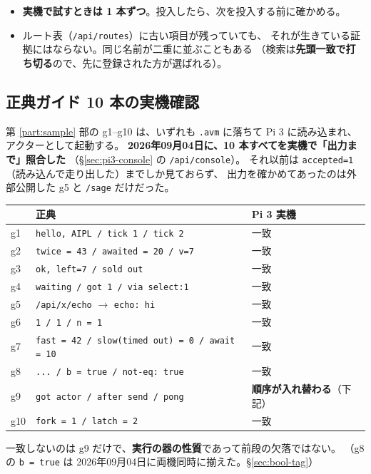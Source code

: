 \documentclass[11pt,a4paper]{ltjsarticle}
\begin{document}
\begin{itemize}
\item \textbf{実機で試すときは 1 本ずつ}。投入したら、次を投入する前に確かめる。
\item ルート表（\texttt{/api/routes}）に古い項目が残っていても、
  それが生きている証拠にはならない。同じ名前が二重に並ぶこともある
  （検索は\textbf{先頭一致で打ち切る}ので、先に登録された方が選ばれる）。
\end{itemize}

\subsection{正典ガイド 10 本の実機確認}

第 \ref{part:sample} 部の g1--g10 は、いずれも \texttt{.avm} に落ちて
Pi 3 に読み込まれ、アクターとして起動する。
\textbf{2026年09月04日に、10 本すべてを実機で「出力まで」照合した}
（\S\ref{sec:pi3-console} の \texttt{/api/console}）。
それ以前は \texttt{accepted=1}（読み込んで走り出した）までしか見ておらず、
出力を確かめてあったのは外部公開した g5 と \texttt{/sage} だけだった。

\begin{center}
\small
\begin{tabular}{@{}lll@{}}
\toprule
 & 正典 & Pi 3 実機 \\
\midrule
g1  & \texttt{hello, AIPL / tick 1 / tick 2} & 一致 \\
g2  & \texttt{twice = 43 / awaited = 20 / v=7} & 一致 \\
g3  & \texttt{ok, left=7 / sold out} & 一致 \\
g4  & \texttt{waiting / got 1 / via select:1} & 一致 \\
g5  & \texttt{/api/x/echo} $\to$ \texttt{echo: hi} & 一致 \\
g6  & \texttt{1 / 1 / n = 1} & 一致 \\
g7  & \texttt{fast = 42 / slow(timed out) = 0 / await = 10} & 一致 \\
g8  & \texttt{... / b = true / not-eq: true} & 一致 \\
g9  & \texttt{got actor / after send / pong} & \textbf{順序が入れ替わる}（下記） \\
g10 & \texttt{fork = 1 / latch = 2} & 一致 \\
\bottomrule
\end{tabular}
\end{center}

一致しないのは g9 だけで、\textbf{実行の器の性質}であって前段の欠落ではない。
（g8 の \texttt{b = true} は 2026年09月04日に両機同時に揃えた。\S\ref{sec:bool-tag}）
\end{document}
